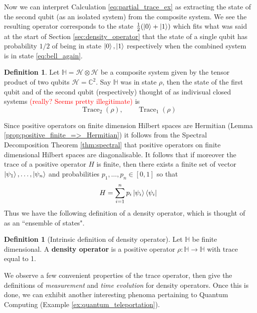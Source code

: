 \documentclass[12pt]{article}
\theoremstyle{plain}
\theoremstyle{definition}
\newtheorem{defn}[thm]{Definition} %
\newcommand{\bb}[1]{\mathbb{#1}}
\newcommand{\call}[1]{\mathcal{#1}}
\newcommand{\lto}{\longrightarrow}
\begin{document}
Now we can interpret Calculation \eqref{eq:partial_trace_ex} as extracting the state of the second qubit (as an isolated system) from the composite system. We see the resulting operator corresponds to the state $\frac{1}{2}(\ket{0} + \ket{1})$ which fits what was said at the start of Section \ref{sec:density_operator} that the state of a single qubit has probability $1/2$ of being in state $\ket{0},\ket{1}$ respectively when the combined system is in state \eqref{eq:bell_again}.

\begin{defn}
	Let $\bb{H} = \call{H} \otimes \call{H}$ be a composite system given by the tensor product of two qubits $\call{H} = \bb{C}^2$. Say $\bb{H}$ was in state $\rho$, then the state of the first qubit and of the second qubit (respectively) thought of as indivisual closed systems \textcolor{red}{(really? Seems pretty illegitimate)} is
	\begin{equation}
		\operatorname{Trace}_2(\rho),\qquad \operatorname{Trace}_1(\rho)
	\end{equation}
\end{defn}

	Since positive operators on finite dimension Hilbert spaces are Hermitian (Lemma \ref{prop:positive_finite_=>_Hermitian}) it follows from the Spectral Decomposition Theorem \ref{thm:spectral} that positive operators on finite dimensional Hilbert spaces are diagonalisable. It follows that if moreover the trace of a positive operator $H$ is finite, then there exists a finite set of vector $\ket{\psi_1},\ldots, \ket{\psi_n}$ and probabilities $p_1,\ldots, p_n \in [0,1]$ so that
	\begin{equation}
	H = \sum_{i = 1}^n p_i\ket{\psi_i}\bra{\psi_i}
	\end{equation}
Thus we have the following definition of a density operator, which is thought of as an ``ensemble of states".
\begin{defn}[Intrinsic definition of density operator]\label{def:density_operator_intrinsic}
	Let $\bb{H}$ be finite dimensional. A \textbf{density operator} is a positive operator $\rho: \bb{H} \lto \bb{H}$ with trace equal to 1.
\end{defn}

We observe a few convenient properties of the trace operator, then give the definitions of \emph{measurement} and \emph{time evolution} for density operators. Once this is done, we can exhibit another interesting phenoma pertaining to Quantum Computing (Example \ref{ex:quantum_teleportation}).
	
\end{document}
